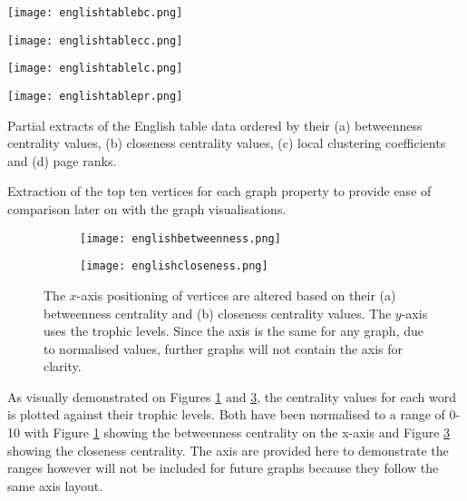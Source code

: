 \begin{table}[!htb]
\centering
\begin{subtable}{.2\textwidth}
	\centering
	\texttt{[image: englishtablebc.png]}
	\caption{}
	\label{table:englishtablebc}
\end{subtable}
\hfill
\begin{subtable}{.2\textwidth}
	\centering
	\texttt{[image: englishtablecc.png]}
	\caption{}
	\label{table:englishtablecc}
\end{subtable}
\hfill
\begin{subtable}{.2\textwidth}
	\centering
	\texttt{[image: englishtablelc.png]}
	\caption{}
	\label{table:englishtablelc}
\end{subtable}
\hfill
\begin{subtable}{.2\textwidth}
	\centering
	\texttt{[image: englishtablepr.png]}
	\caption{}
	\label{table:englishtablepr}
\end{subtable}
\caption{Partial extracts of the English table data ordered by their (a) betweenness centrality values, (b) closeness centrality values, (c) local clustering coefficients and (d) page ranks.}
\end{table}

Extraction of the top ten vertices for each graph property to provide ease of comparison later on with the graph visualisations.

\begin{figure}[!htb]
\centering
\begin{subfigure}{.45\textwidth}
	\hspace{-1.2cm} 
	\texttt{[image: englishbetweenness.png]}
	\caption{}
	\label{fig:engbc}
\end{subfigure}
\hfill
\begin{subfigure}{.45\textwidth}
	\hspace{-1cm} 
	\texttt{[image: englishcloseness.png]}
	\caption{}
	\label{fig:engcc}
\end{subfigure}
\caption{The $x$-axis positioning of vertices are altered based on their (a) betweenness centrality and (b) closeness centrality values. The $y$-axis uses the trophic levels. Since the axis is the same for any graph, due to normalised values, further graphs will not contain the axis for clarity.}
\end{figure}

As visually demonstrated on Figures \ref{fig:engbc} and \ref{fig:engcc}, the centrality values for each word is plotted against their trophic levels. Both have been normalised to a range of 0-10 with Figure \ref{fig:engbc} showing the betweenness centrality on the x-axis and Figure \ref{fig:engcc} showing the closeness centrality. The axis are provided here to demonstrate the ranges however will not be included for future graphs because they follow the same axis layout.

